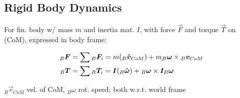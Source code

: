 \subsection{Rigid Body Dynamics}
\inlinedefinition[Newton II] For fin. body w/ mass $m$ and inertia mat. $I$, with force $\vec{F}$ and torque $\vec{T}$ on  (CoM), expressed in body frame:

\rmvspace[1.5]
\begin{align*}
    {_B}\bm{F} &= \sum {_B}\bm{F}_i = m({_B} \bm{\dot{v}}_{CoM}) + m_B \bm{\omega} \times {_B}\bm{v}_{CoM}           \\
    {_B}\bm{T} &= \sum {_B}\bm{T}_i = \bm{I}({_B} \bm{\dot{\omega}}) + {_B} \bm{\omega} \times \bm{I}_B\bm{\omega}
\end{align*}

\rmvspace
${_B} \vec{v}_{CoM}$ vel. of CoM, ${_B}\omega$ rot. speed; both w.r.t. world frame
